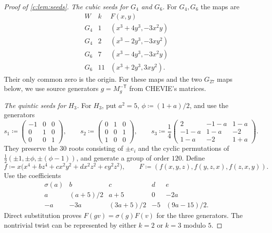 \documentclass[10pt,a4paper]{amsart}
\newcommand{\defeq}{\coloneqq}
\theoremstyle{definition}
\begin{document}
\begin{proof}[Proof of \cref{c:lem:seeds}]
\emph{The cubic seeds for $G_4$ and $G_6$.}
For $G_4,G_6$ the maps are
\[
\begin{array}{c|c|c}
 W&k&F(x,y)\\\hline
 G_4&1&(x^3+4y^3,-3x^2y)\\
 G_4&2&(x^3-2y^3,-3xy^2)\\
 G_6&7&(x^3-4y^3,-3x^2y)\\
 G_6&11&(x^3+2y^3,3xy^2).
\end{array}
\]
Their only common zero is the origin. For these maps and the two
$G_{27}$ maps below, we use source generators $g=M_g^{-\mathsf T}$
from CHEVIE's matrices.

\emph{The quintic seeds for $H_3$.}
For $H_3$, put $a^2=5$, $\phi\defeq(1+a)/2$, and use the generators
\[
 s_1\defeq\begin{pmatrix}-1&0&0\\0&1&0\\0&0&1\end{pmatrix},\qquad
 s_2\defeq\begin{pmatrix}0&1&0\\0&0&1\\1&0&0\end{pmatrix},\qquad
 s_3\defeq\frac14\begin{pmatrix}
 2&-1-a&1-a\\
 -1-a&1-a&-2\\
 1-a&-2&1+a
 \end{pmatrix}.
\]
They preserve the $30$ roots consisting of $\pm e_i$ and the cyclic
permutations of $\tfrac12(\pm1,\pm\phi,\pm(\phi-1))$, and generate
a group of order $120$. Define
\[
 f\defeq x\bigl(x^4+bz^4+cx^2y^2+dx^2z^2+ey^2z^2\bigr),
 \qquad F\defeq(f(x,y,z),f(y,z,x),f(z,x,y)).
\]
Use the coefficients
\[
\begin{array}{c|rrrr}
 \sigma(a)&b&c&d&e\\\hline
 a&(a+5)/2&a+5&0&-2a\\
 -a&-3a&(3a+5)/2&-5&(9a-15)/2.
\end{array}
\]
Direct substitution proves $F(gv)=\sigma(g)F(v)$ for the three generators.
The nontrivial twist can be represented by either $k=2$ or $k=3$
modulo $5$.


\end{proof}
\end{document}
